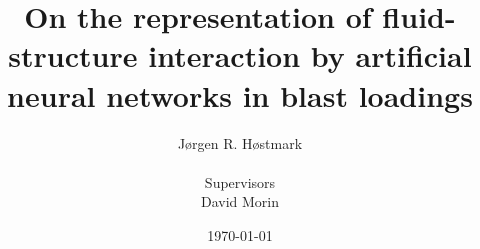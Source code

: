 \newcommand{\mytitle}{On the representation of fluid-structure interaction by artificial neural networks in blast loadings} %
\newcommand{\myauthor}{
Jørgen R. Høstmark\\~\\

Supervisors\\ 
David Morin\\
}

\title{\mytitle}
\author{\myauthor}
\date{\today}